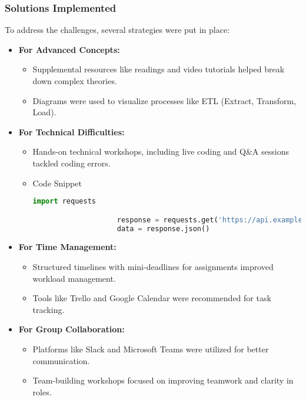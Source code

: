 \documentclass[aspectratio=169]{beamer}
\begin{document}
\begin{frame}
    \frametitle{Solutions Implemented}
    To address the challenges, several strategies were put in place:
    
    \begin{itemize}
        \item \textbf{For Advanced Concepts:}
        \begin{itemize}
            \item Supplemental resources like readings and video tutorials helped break down complex theories.
            \item Diagrams were used to visualize processes like ETL (Extract, Transform, Load).
        \end{itemize}
        
        \item \textbf{For Technical Difficulties:}
        \begin{itemize}
            \item Hands-on technical workshops, including live coding and Q&A sessions tackled coding errors.
            \item \begin{block}{Code Snippet}
                \begin{lstlisting}[language=Python]
                    import requests

                    response = requests.get('https://api.example.com/data')
                    data = response.json()
                \end{lstlisting}
            \end{block}
        \end{itemize}
        
        \item \textbf{For Time Management:}
        \begin{itemize}
            \item Structured timelines with mini-deadlines for assignments improved workload management.
            \item Tools like Trello and Google Calendar were recommended for task tracking.
        \end{itemize}
        
        \item \textbf{For Group Collaboration:}
        \begin{itemize}
            \item Platforms like Slack and Microsoft Teams were utilized for better communication.
            \item Team-building workshops focused on improving teamwork and clarity in roles.
        \end{itemize}
    \end{itemize}
\end{frame}
\end{document}
